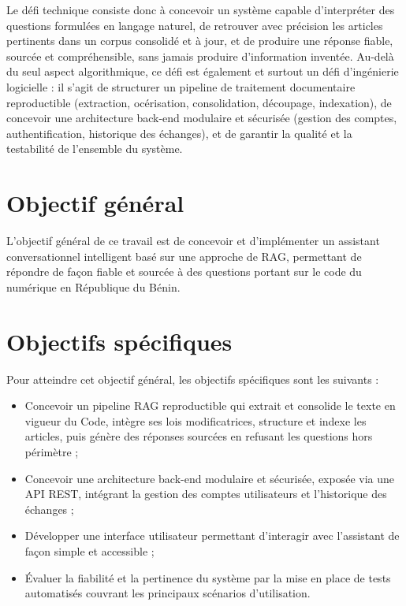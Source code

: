 Le défi technique consiste donc à concevoir un système capable d'interpréter des questions formulées en langage naturel, de retrouver avec précision les articles pertinents dans un corpus consolidé et à jour, et de produire une réponse fiable, sourcée et compréhensible, sans jamais produire d'information inventée. Au-delà du seul aspect algorithmique, ce défi est également et surtout un défi d'ingénierie logicielle : il s'agit de structurer un pipeline de traitement documentaire reproductible (extraction, océrisation, consolidation, découpage, indexation), de concevoir une architecture back-end modulaire et sécurisée (gestion des comptes, authentification, historique des échanges), et de garantir la qualité et la testabilité de l'ensemble du système.




\section*{Objectif général}

L'objectif général de ce travail est de concevoir et d'implémenter un assistant conversationnel intelligent basé sur une approche de RAG, permettant de répondre de façon fiable et sourcée à des questions portant sur le code du numérique en République du Bénin.


\section*{ Objectifs spécifiques}

Pour atteindre cet objectif général, les objectifs spécifiques sont les
suivants :

\begin{itemize}

    \item[-] Concevoir un pipeline RAG reproductible qui extrait et consolide le texte en vigueur du Code, intègre ses lois modificatrices, structure et indexe les articles, puis génère des réponses sourcées en refusant les questions hors périmètre ;

    \item[-] Concevoir une architecture back-end modulaire et sécurisée, exposée via une API REST, intégrant la gestion des comptes utilisateurs et l'historique des échanges ;

    \item[-] Développer une interface utilisateur permettant d'interagir avec l'assistant de façon simple et accessible ;

    \item[-] Évaluer la fiabilité et la pertinence du système par la mise en place de tests automatisés couvrant les principaux scénarios d'utilisation.

\end{itemize}


